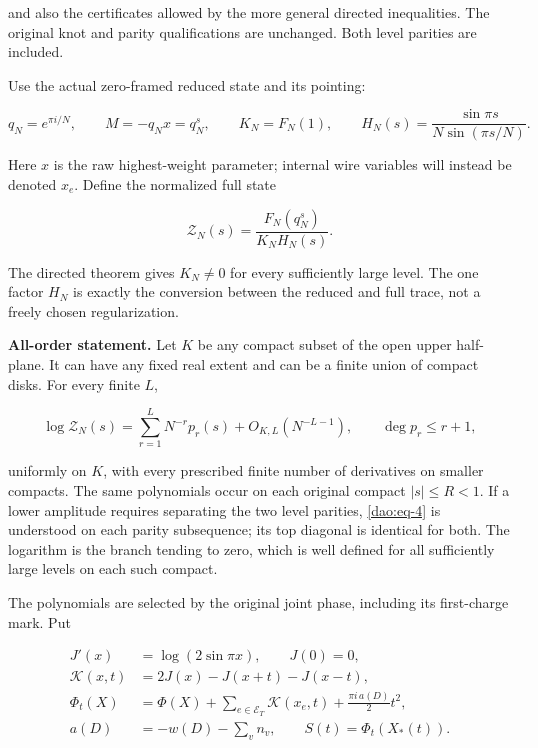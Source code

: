 and also the certificates allowed by the more general directed inequalities. The original knot and parity qualifications are unchanged. Both level parities are included.

Use the actual zero-framed reduced state and its pointing:

\begin{equation}\label{dao:eq-2}
q_N=e^{\pi i/N},\qquad M=-q_Nx=q_N^s,\qquad
 K_N=F_N(1),\qquad
 H_N(s)=\frac{\sin\pi s}{N\sin(\pi s/N)}.
\end{equation}

Here \(x\) is the raw highest-weight parameter; internal wire variables will instead be denoted \(x_e\). Define the normalized full state

\begin{equation}\label{dao:eq-3}
\mathcal Z_N(s)=\frac{F_N(q_N^s)}{K_NH_N(s)}.
\end{equation}

The directed theorem gives \(K_N\ne0\) for every sufficiently large level. The one factor \(H_N\) is exactly the conversion between the reduced and full trace, not a freely chosen regularization.

\textbf{All-order statement.} Let \(K\) be any compact subset of the open upper half-plane. It can have any fixed real extent and can be a finite union of compact disks. For every finite \(L\),

\begin{equation}\label{dao:eq-4}
\log\mathcal Z_N(s)
   =\sum_{r=1}^{L}N^{-r}p_r(s)+O_{K,L}(N^{-L-1}),
 \qquad \deg p_r\le r+1,
\end{equation}

uniformly on \(K\), with every prescribed finite number of derivatives on smaller compacts. The same polynomials occur on each original compact \(|s|\le R<1\). If a lower amplitude requires separating the two level parities, \eqref{dao:eq-4} is understood on each parity subsequence; its top diagonal is identical for both. The logarithm is the branch tending to zero, which is well defined for all sufficiently large levels on each such compact.

The polynomials are selected by the original joint phase, including its first-charge mark. Put

\begin{equation}\label{dao:eq-5}
\begin{aligned}
 J'(x)&=\log(2\sin\pi x),\qquad J(0)=0,\\
 \mathcal K(x,t)&=2J(x)-J(x+t)-J(x-t),\\
 \Phi_t(X)&=\Phi(X)+\sum_{e\in\mathcal E_T}\mathcal K(x_e,t)
                         +\frac{\pi i\,a(D)}2t^2,\\
 a(D)&=-w(D)-\sum_v n_v,\qquad
 S(t)=\Phi_t(X_*(t)).
 \end{aligned}
\end{equation}

